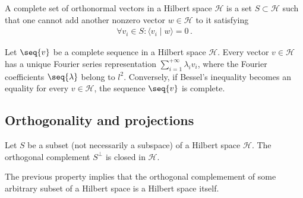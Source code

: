     \begin{adefinition}
        A complete set of orthonormal vectors in a Hilbert space $\mathcal{H}$ is a set $S\subset\mathcal{H}$ such that one cannot add another nonzero vector $w\in\mathcal{H}$ to it satisfying
        \begin{gather}
            \forall v_i\in S:\langle v_i\mid w\rangle = 0\,.
        \end{gather}
    \end{adefinition}

    \begin{theorem}[Parceval]
        Let $\seq{v}$ be a complete sequence in a Hilbert space $\mathcal{H}$. Every vector $v\in\mathcal{H}$ has a unique Fourier series representation $\sum_{i=1}^{+\infty}\lambda_iv_i$, where the Fourier coefficients $\seq{\lambda}$ belong to $l^2$. Conversely, if Bessel's inequality becomes an equality for every $v\in\mathcal{H}$, the sequence $\seq{v}$ is complete.
    \end{theorem}

\subsection{Orthogonality and projections}

    \begin{property}
        Let $S$ be a subset (not necessarily a subspace) of a Hilbert space $\mathcal{H}$. The orthogonal complement $S^\perp$ is closed in $\mathcal{H}$.
    \end{property}
    \begin{result}
        The previous property implies that the orthogonal complemement of some arbitrary subset of a Hilbert space is a Hilbert space itself.
    \end{result}

